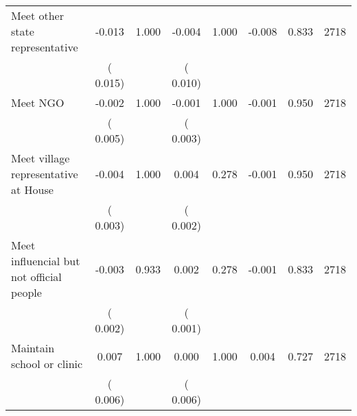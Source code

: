 \begin{tabular}{l*{7}{c}}
 Meet other state representative       &             -0.013       &        1.000  &             -0.004       &        1.000  &             -0.008       &              0.833 &  2718 \\ 
                       &       (       0.015)             &                               &       (       0.010)                     &                               &                                               &                                &                      \\ 

 Meet NGO       &             -0.002       &        1.000  &             -0.001       &        1.000  &             -0.001       &              0.950 &  2718 \\ 
                       &       (       0.005)             &                               &       (       0.003)                     &                               &                                               &                                &                      \\ 

 Meet village representative at House       &             -0.004       &        1.000  &              0.004       &        0.278  &             -0.001       &              0.950 &  2718 \\ 
                       &       (       0.003)             &                               &       (       0.002)                     &                               &                                               &                                &                      \\ 

 Meet influencial but not official people       &             -0.003       &        0.933  &              0.002       &        0.278  &             -0.001       &              0.833 &  2718 \\ 
                       &       (       0.002)             &                               &       (       0.001)                     &                               &                                               &                                &                      \\ 

 Maintain school or clinic       &              0.007       &        1.000  &              0.000       &        1.000  &              0.004       &              0.727 &  2718 \\ 
                       &       (       0.006)             &                               &       (       0.006)                     &                               &                                               &                                &                      \\ 


\end{tabular}
